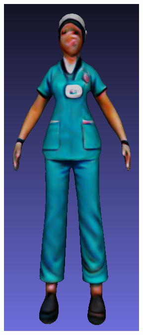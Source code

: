 \begin{figure}[H]
    \centering
    \small
    \begin{subfigure}[b]{0.13\textwidth}
        \centering
        \includegraphics[width=\textwidth]{figures/future/bias_nurse_genie_1.png}

\end{subfigure}
\end{figure}
